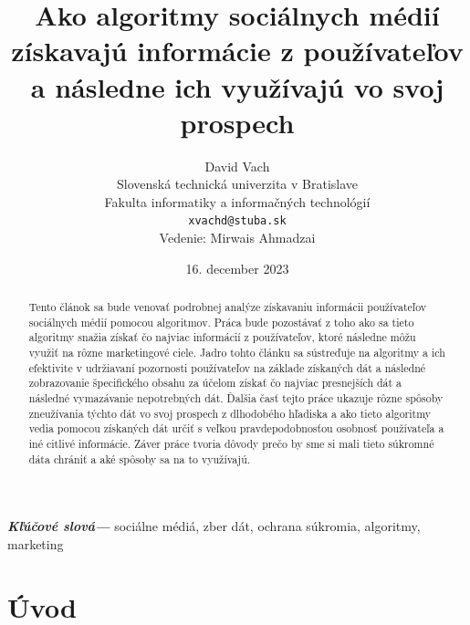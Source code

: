 \documentclass[12pt,twoside,slovak,a4paper]{article}
\title{Ako algoritmy sociálnych médií získavajú informácie 
z používateľov a následne ich využívajú vo svoj 
prospech}
\author{David Vach\\
	{\small Slovenská technická univerzita v Bratislave}\\
	{\small Fakulta informatiky a informačných technológií}\\
	{\small \texttt{xvachd@stuba.sk}}\\
	{\small Vedenie: Mirwais Ahmadzai}
}
\date{\small 16. december 2023}
\newcommand{\keywords}[1]{
  \small	
  \textbf{\textit{Kľúčové slová---}} #1
}
\begin{document}
\maketitle

\begin{abstract}
Tento článok sa bude venovať podrobnej analýze získavaniu informácii používateľov sociálnych médií pomocou algoritmov. Práca bude pozostávať z toho ako sa tieto algoritmy snažia získať čo najviac informácií z používateľov, ktoré následne môžu využiť na rôzne marketingové ciele. Jadro tohto článku sa sústreďuje na algoritmy a ich efektivite v udržiavaní pozornosti používateľov na základe získaných dát a následné zobrazovanie špecifického obsahu za účelom získať čo najviac presnejších dát a následné vymazávanie nepotrebných dát. Ďalšia časť tejto práce ukazuje rôzne spôsoby zneužívania týchto dát vo svoj prospech z dlhodobého hľadiska a ako tieto algoritmy vedia pomocou získaných dát určiť s veľkou pravdepodobnosťou osobnosť používateľa a iné citlivé informácie. Záver práce tvoria dôvody prečo by sme si mali tieto súkromné dáta chrániť a aké spôsoby sa na to využívajú.
\end{abstract}

\keywords{sociálne médiá, zber dát, ochrana súkromia, algoritmy, marketing}

\newpage
\section{Úvod}
\end{document}
